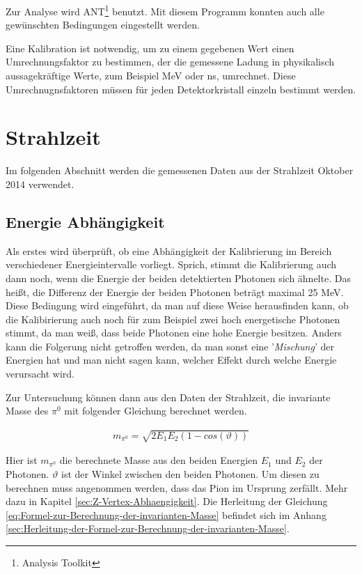 \documentclass[a4paper,11pt,oneside,final,german,openbib,pdftex]{scrbook}
\begin{document}
{Zur Analyse wird ANT\footnote{Analysis Toolkit} benutzt. Mit diesem Programm konnten auch alle gew\"unschten Bedingungen eingestellt werden. 
\newline

Eine Kalibration ist notwendig, um zu einem gegebenen Wert einen Umrechnungsfaktor zu bestimmen, der die gemessene Ladung in physikalisch aussagekr\"aftige Werte, zum Beispiel MeV oder ns, umrechnet. Diese Umrechnugnsfaktoren m\"ussen f\"ur jeden Detektorkristall einzeln bestimmt werden.\cite{Un08}



\section{Strahlzeit}
\label{sec:Reelle-Daten}

Im folgenden Abschnitt werden die gemessenen Daten aus der Strahlzeit Oktober 2014 verwendet.

\subsection{Energie Abhängigkeit}
\label{sec:Energie-Interval-Abhaengigkeit}

Als erstes wird überprüft, ob eine Abhängigkeit der Kalibrierung im Bereich verschiedener Energieintervalle vorliegt. Sprich, stimmt die Kalibrierung auch dann noch, wenn die Energie der beiden detektierten Photonen sich ähnelte. Das hei{\ss}t, die Differenz der Energie der beiden Photonen betr\"agt maximal 25 MeV. Diese Bedingung wird eingef\"uhrt, da man auf diese Weise herausfinden kann, ob die Kalibirierung auch noch f\"ur zum Beispiel zwei hoch energetische Photonen stimmt, da man wei{\ss}, dass beide Photonen eine hohe Energie besitzen. Anders kann die Folgerung nicht getroffen werden, da man sonst eine '\textit{Mischung}' der Energien hat und man nicht sagen kann, welcher Effekt durch welche Energie verursacht wird.

Zur Untersuchung k\"onnen dann aus den Daten der Strahlzeit, die invariante Masse des $\pi^0$ mit folgender Gleichung berechnet werden.

 \begin{equation}
 \begin{split}
 {m_{\pi^0}=\sqrt{2E_1E_2(1-cos(\vartheta))}}
 \label{eq:Formel-zur-Berechnung-der-invarianten-Masse}
 \end{split}
 \end{equation}

Hier ist $m_{\pi^0}$ die berechnete Masse aus den beiden Energien $E_1$ und $E_2$ der Photonen. $\vartheta$ ist der Winkel zwischen den beiden Photonen. Um diesen zu berechnen muss angenommen werden, dass das Pion im Ursprung zerf\"allt. Mehr dazu in Kapitel \ref{sec:Z-Vertex-Abhaengigkeit}.
Die Herleitung der Gleichung \ref{eq:Formel-zur-Berechnung-der-invarianten-Masse} befindet sich im Anhang \ref{sec:Herleitung-der-Formel-zur-Berechnung-der-invarianten-Masse}.

}
\end{document}

